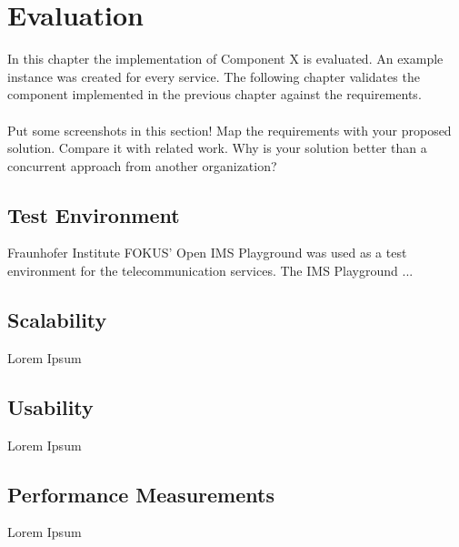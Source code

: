 \chapter{Evaluation\label{cha:chapter5}}

In this chapter the implementation of Component X is evaluated. An example instance was created for every service. The following chapter validates the component implemented in the previous chapter against the requirements.
\\
\\
Put some screenshots in this section! Map the requirements with your proposed solution. Compare it with related work. Why is your solution better than a concurrent approach from another organization?

\section{Test Environment\label{sec:testenvir}}

Fraunhofer Institute FOKUS' Open IMS Playground was used as a test environment for the telecommunication services. The IMS Playground ...

\section{Scalability\label{sec:scal}}

Lorem Ipsum

\section{Usability\label{sec:usab}}

Lorem Ipsum

\section{Performance Measurements\label{sec:performance}}

Lorem Ipsum